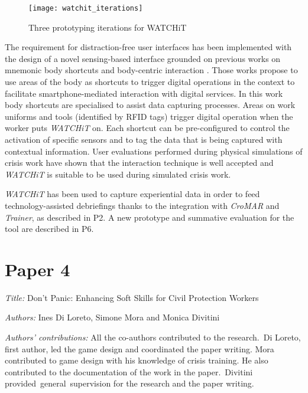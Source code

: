 \begin{figure}
	[tbh] \centering 
	\texttt{[image: watchit\_iterations]} \caption{Three prototyping iterations for WATCHiT} \label{fig:watchit-prototypes} 
\end{figure}

The requirement for distraction-free user interfaces has been implemented with the design of a novel sensing-based interface grounded on previous works on mnemonic body shortcuts and body-centric interaction \autocites{Guerreiro:2008wt}{Chen:2012wk}. Those works propose to use areas of the body as shortcuts to trigger digital operations in the context to facilitate smartphone-mediated interaction with digital services. In this work body shortcuts are specialised to assist data capturing processes. Areas on work uniforms and tools (identified by RFID tags) trigger digital operation when the worker puts \emph{WATCHiT} on. Each shortcut can be pre-configured to control the activation of specific sensors and to tag the data that is being captured with contextual information. User evaluations performed during physical simulations of crisis work have shown that the interaction technique is well accepted and \emph{WATCHiT} is suitable to be used during simulated crisis work.

\emph{WATCHiT} has been used to capture experiential data in order to feed technology-assisted debriefings thanks to the integration with \emph{CroMAR} and \emph{Trainer}, as described in P2. A new prototype and summative evaluation for the tool are described in P6.


\section[P4: Don't Panic: Enhancing Soft Skills for Civil Protection Workers]{Paper 4}\label{paper-4}

\emph{Title:} Don't Panic: Enhancing Soft Skills for Civil Protection Workers

\emph{Authors:} Ines Di Loreto, Simone Mora and Monica Divitini

\emph{Authors' contributions:} All the co-authors contributed to the research.~Di Loreto, first author, led the game design and coordinated the paper writing. Mora contributed to game design with his knowledge of crisis training. He also contributed to the documentation of the work in the paper.~Divitini provided~general~supervision for the research and the paper writing.

